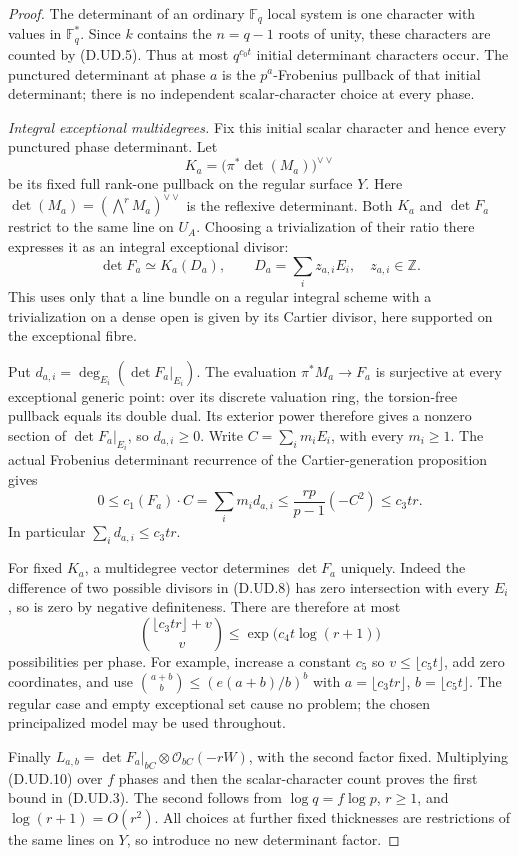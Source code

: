 \begin{proof}
The determinant of an ordinary $\mathbb F_q$ local system is
one character with values in $\mathbb F_q^*$. Since $k$ contains
the $n=q-1$ roots of unity, these characters are counted by
(D.UD.5). Thus at most $q^{c_0t}$ initial determinant
characters occur. The punctured determinant at phase $a$ is
the $p^a$-Frobenius pullback of that initial determinant;
there is no independent scalar-character choice at every phase.

\emph{Integral exceptional multidegrees.}
Fix this initial scalar character and hence every punctured
phase determinant. Let
\[
 K_a=\bigl(\pi^*\det(M_a)\bigr)^{\vee\vee}
\]
be its fixed full rank-one pullback on the regular surface $Y$.
Here $\det(M_a)=(\bigwedge^r M_a)^{\vee\vee}$ is the reflexive
determinant.
Both $K_a$ and $\det F_a$ restrict to the same line on $U_A$.
Choosing a trivialization of their ratio there expresses it
as an integral exceptional divisor:
\[
                     \det F_a\simeq K_a(D_a),
             \qquad D_a=\sum_i z_{a,i}E_i,\quad z_{a,i}\in\mathbb Z.
                                                        \tag{D.UD.8}
\]
This uses only that a line bundle on a regular integral scheme
with a trivialization on a dense open is given by its Cartier
divisor, here supported on the exceptional fibre.

Put $d_{a,i}=\deg_{E_i}(\det F_a|_{E_i})$.
The evaluation $\pi^*M_a\to F_a$ is surjective at every
exceptional generic point: over its discrete valuation ring,
the torsion-free pullback equals its double dual. Its exterior
power therefore gives a nonzero section of $\det F_a|_{E_i}$,
so $d_{a,i}\ge0$. Write $C=\sum_i m_iE_i$, with every
$m_i\ge1$. The actual Frobenius determinant recurrence of the
Cartier-generation proposition gives
\[
 0\le c_1(F_a)\cdot C
       =\sum_i m_i d_{a,i}
       \le \frac{rp}{p-1}(-C^2)\le c_3tr.              \tag{D.UD.9}
\]
In particular $\sum_i d_{a,i}\le c_3tr$.

For fixed $K_a$, a multidegree vector determines $\det F_a$
uniquely. Indeed the difference of two possible divisors in
(D.UD.8) has zero intersection with every $E_i$, so is zero
by negative definiteness. There are therefore at most
\[
             \binom{\lfloor c_3tr\rfloor+v}{v}
                    \le \exp\bigl(c_4t\log(r+1)\bigr) \tag{D.UD.10}
\]
possibilities per phase. For example, increase a constant
$c_5$ so $v\le\lfloor c_5t\rfloor$, add zero coordinates,
and use $\binom{a+b}{b}\le(e(a+b)/b)^b$ with
$a=\lfloor c_3tr\rfloor$, $b=\lfloor c_5t\rfloor$.
The regular case and empty exceptional set cause no problem;
the chosen principalized model may be used throughout.

Finally $L_{a,b}=\det F_a|_{bC}\otimes\mathcal O_{bC}(-rW)$,
with the second factor fixed. Multiplying (D.UD.10) over
$f$ phases and then the scalar-character count proves the
first bound in (D.UD.3). The second follows from
$\log q=f\log p$, $r\ge1$, and $\log(r+1)=O(r^2)$.
All choices at further fixed thicknesses are restrictions of
the same lines on $Y$, so introduce no new determinant factor.
\end{proof}


